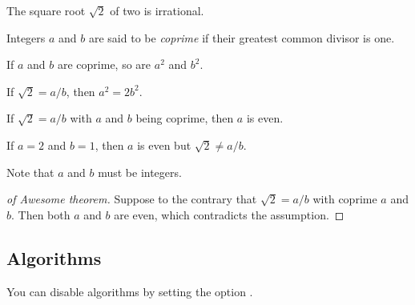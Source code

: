 \documentclass[11pt,a4paper]{article}
\begin{document}
\begin{cnltxexample}
  \begin{theorem}
    The square root $\sqrt{2}$ of two is irrational.
  \end{theorem}

  \begin{definition}[Coprime]
    Integers $a$ and $b$ are said to be \emph{coprime} if their greatest common divisor is one.
  \end{definition}

  \begin{lemma}
    If $a$ and $b$ are coprime, so are $a^2$ and $b^2$.
  \end{lemma}

  \begin{proposition}
    If $\sqrt{2} = a/b$, then $a^2 = 2b^2$.
  \end{proposition}

  \begin{corollary}
    If $\sqrt{2} = a/b$ with $a$ and $b$ being coprime, then $a$ is even.
  \end{corollary}

  \begin{example}
    If $a = 2$ and $b = 1$, then $a$ is even but $\sqrt{2} \ne a/b$.
  \end{example}

  \begin{remark}
    Note that $a$ and $b$ must be integers.
  \end{remark}

  \begin{proof}[of Awesome theorem]
    Suppose to the contrary that $\sqrt{2} = a/b$ with coprime $a$ and $b$.
    Then both $a$ and $b$ are even, which contradicts the assumption.
  \end{proof}
\end{cnltxexample}

\subsection{Algorithms}

You can disable algorithms by setting the option .

\begin{cnltxexample}
  \begin{algorithmic}[1]
    \EndFor
  \end{algorithmic}
\end{cnltxexample}
\end{document}
